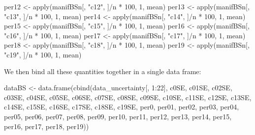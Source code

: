 \documentclass[
]{article}
\newenvironment{Shaded}{\begin{snugshade}}{\end{snugshade}}
\newcommand{\DecValTok}[1]{\textcolor[rgb]{0.00,0.00,0.81}{#1}}
\newcommand{\FunctionTok}[1]{\textcolor[rgb]{0.00,0.00,0.00}{#1}}
\newcommand{\NormalTok}[1]{#1}
\newcommand{\OtherTok}[1]{\textcolor[rgb]{0.56,0.35,0.01}{#1}}
\newcommand{\SpecialCharTok}[1]{\textcolor[rgb]{0.00,0.00,0.00}{#1}}
\newcommand{\StringTok}[1]{\textcolor[rgb]{0.31,0.60,0.02}{#1}}
\begin{document}
\begin{Shaded}
\begin{Highlighting}[]
\NormalTok{per12 }\OtherTok{\textless{}{-}} \FunctionTok{apply}\NormalTok{(manifBSn[, }\StringTok{"c12"}\NormalTok{, ]}\SpecialCharTok{/}\NormalTok{n }\SpecialCharTok{*} \DecValTok{100}\NormalTok{, }\DecValTok{1}\NormalTok{, mean)}
\NormalTok{per13 }\OtherTok{\textless{}{-}} \FunctionTok{apply}\NormalTok{(manifBSn[, }\StringTok{"c13"}\NormalTok{, ]}\SpecialCharTok{/}\NormalTok{n }\SpecialCharTok{*} \DecValTok{100}\NormalTok{, }\DecValTok{1}\NormalTok{, mean)}
\NormalTok{per14 }\OtherTok{\textless{}{-}} \FunctionTok{apply}\NormalTok{(manifBSn[, }\StringTok{"c14"}\NormalTok{, ]}\SpecialCharTok{/}\NormalTok{n }\SpecialCharTok{*} \DecValTok{100}\NormalTok{, }\DecValTok{1}\NormalTok{, mean)}
\NormalTok{per15 }\OtherTok{\textless{}{-}} \FunctionTok{apply}\NormalTok{(manifBSn[, }\StringTok{"c15"}\NormalTok{, ]}\SpecialCharTok{/}\NormalTok{n }\SpecialCharTok{*} \DecValTok{100}\NormalTok{, }\DecValTok{1}\NormalTok{, mean)}
\NormalTok{per16 }\OtherTok{\textless{}{-}} \FunctionTok{apply}\NormalTok{(manifBSn[, }\StringTok{"c16"}\NormalTok{, ]}\SpecialCharTok{/}\NormalTok{n }\SpecialCharTok{*} \DecValTok{100}\NormalTok{, }\DecValTok{1}\NormalTok{, mean)}
\NormalTok{per17 }\OtherTok{\textless{}{-}} \FunctionTok{apply}\NormalTok{(manifBSn[, }\StringTok{"c17"}\NormalTok{, ]}\SpecialCharTok{/}\NormalTok{n }\SpecialCharTok{*} \DecValTok{100}\NormalTok{, }\DecValTok{1}\NormalTok{, mean)}
\NormalTok{per18 }\OtherTok{\textless{}{-}} \FunctionTok{apply}\NormalTok{(manifBSn[, }\StringTok{"c18"}\NormalTok{, ]}\SpecialCharTok{/}\NormalTok{n }\SpecialCharTok{*} \DecValTok{100}\NormalTok{, }\DecValTok{1}\NormalTok{, mean)}
\NormalTok{per19 }\OtherTok{\textless{}{-}} \FunctionTok{apply}\NormalTok{(manifBSn[, }\StringTok{"c19"}\NormalTok{, ]}\SpecialCharTok{/}\NormalTok{n }\SpecialCharTok{*} \DecValTok{100}\NormalTok{, }\DecValTok{1}\NormalTok{, mean)}
\end{Highlighting}
\end{Shaded}

We then bind all these quantities together in a single data frame:

\begin{Shaded}
\begin{Highlighting}[]
\NormalTok{dataBS }\OtherTok{\textless{}{-}} \FunctionTok{data.frame}\NormalTok{(}\FunctionTok{cbind}\NormalTok{(data\_uncertainty[, }\DecValTok{1}\SpecialCharTok{:}\DecValTok{22}\NormalTok{], c0SE, c01SE,}
\NormalTok{    c02SE, c03SE, c04SE, c05SE, c06SE, c07SE, c08SE, c09SE, c10SE,}
\NormalTok{    c11SE, c12SE, c13SE, c14SE, c15SE, c16SE, c17SE, c18SE, c19SE,}
\NormalTok{    per0, per01, per02, per03, per04, per05, per06, per07, per08,}
\NormalTok{    per09, per10, per11, per12, per13, per14, per15, per16, per17,}
\NormalTok{    per18, per19))}
\end{Highlighting}
\end{Shaded}
\end{document}

